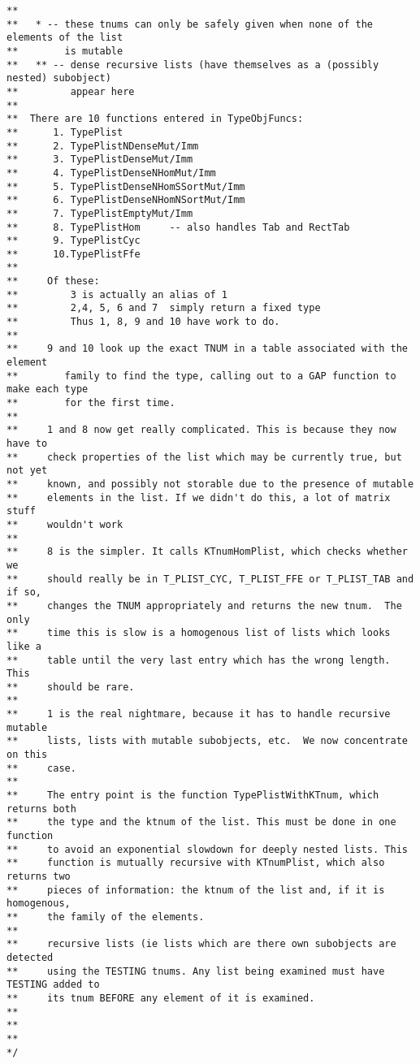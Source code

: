 \documentclass{article}
\begin{document}
\begin{verbatim}
**
**   * -- these tnums can only be safely given when none of the elements of the list
**        is mutable
**   ** -- dense recursive lists (have themselves as a (possibly nested) subobject)
**         appear here
**
**  There are 10 functions entered in TypeObjFuncs:
**      1. TypePlist
**      2. TypePlistNDenseMut/Imm
**      3. TypePlistDenseMut/Imm
**      4. TypePlistDenseNHomMut/Imm
**      5. TypePlistDenseNHomSSortMut/Imm
**      6. TypePlistDenseNHomNSortMut/Imm
**      7. TypePlistEmptyMut/Imm
**      8. TypePlistHom     -- also handles Tab and RectTab
**      9. TypePlistCyc
**      10.TypePlistFfe
**
**     Of these:
**         3 is actually an alias of 1
**         2,4, 5, 6 and 7  simply return a fixed type
**         Thus 1, 8, 9 and 10 have work to do.
**
**     9 and 10 look up the exact TNUM in a table associated with the element
**        family to find the type, calling out to a GAP function to make each type
**        for the first time.
**
**     1 and 8 now get really complicated. This is because they now have to
**     check properties of the list which may be currently true, but not yet
**     known, and possibly not storable due to the presence of mutable
**     elements in the list. If we didn't do this, a lot of matrix stuff
**     wouldn't work
**
**     8 is the simpler. It calls KTnumHomPlist, which checks whether we
**     should really be in T_PLIST_CYC, T_PLIST_FFE or T_PLIST_TAB and if so,
**     changes the TNUM appropriately and returns the new tnum.  The only
**     time this is slow is a homogenous list of lists which looks like a
**     table until the very last entry which has the wrong length. This
**     should be rare.
**     
**     1 is the real nightmare, because it has to handle recursive mutable
**     lists, lists with mutable subobjects, etc.  We now concentrate on this
**     case.
**
**     The entry point is the function TypePlistWithKTnum, which returns both
**     the type and the ktnum of the list. This must be done in one function
**     to avoid an exponential slowdown for deeply nested lists. This
**     function is mutually recursive with KTnumPlist, which also returns two
**     pieces of information: the ktnum of the list and, if it is homogenous,
**     the family of the elements.
**
**     recursive lists (ie lists which are there own subobjects are detected
**     using the TESTING tnums. Any list being examined must have TESTING added to
**     its tnum BEFORE any element of it is examined.
**
**     
**
*/
\end{verbatim}
\end{document}
